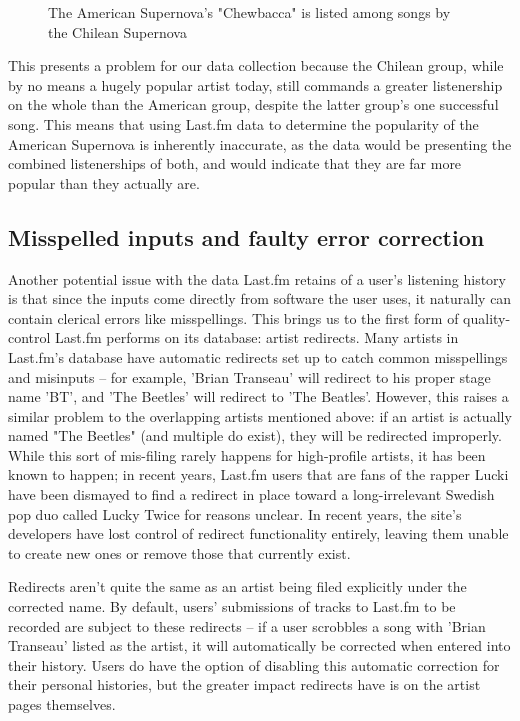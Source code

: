 \begin{figure}[!ht]
	\begin{center}
		\caption[Overlapping artist names]{The American Supernova's "Chewbacca" is listed among songs by the Chilean Supernova}\label{chewbacca}
	\end{center}
\end{figure}

This presents a problem for our data collection because the Chilean group, while by no means a hugely popular artist today, still commands a greater listenership on the whole than the American group, despite the latter group's one successful song. This means that using Last.fm data to determine the popularity of the American Supernova is inherently inaccurate, as the data would be presenting the combined listenerships of both, and would indicate that they are far more popular than they actually are.

\subsection{Misspelled inputs and faulty error correction}

Another potential issue with the data Last.fm retains of a user's listening history is that since the inputs come directly from software the user uses, it naturally can contain clerical errors like misspellings. This brings us to the first form of quality-control Last.fm performs on its database: artist redirects. Many artists in Last.fm's database have automatic redirects set up to catch common misspellings and misinputs -- for example, 'Brian Transeau' will redirect to his proper stage name 'BT', and 'The Beetles' will redirect to 'The Beatles'. However, this raises a similar problem to the overlapping artists mentioned above: if an artist is actually named "The Beetles" (and multiple do exist), they will be redirected improperly. While this sort of mis-filing rarely happens for high-profile artists, it has been known to happen; in recent years, Last.fm users that are fans of the rapper Lucki have been dismayed to find a redirect in place toward a long-irrelevant Swedish pop duo called Lucky Twice for reasons unclear. In recent years, the site's developers have lost control of redirect functionality entirely, leaving them unable to create new ones or remove those that currently exist.

Redirects aren't quite the same as an artist being filed explicitly under the corrected name. By default, users' submissions of tracks to Last.fm to be recorded are subject to these redirects -- if a user scrobbles a song with 'Brian Transeau' listed as the artist, it will automatically be corrected when entered into their history. Users do have the option of disabling this automatic correction for their personal histories, but the greater impact redirects have is on the artist pages themselves.

